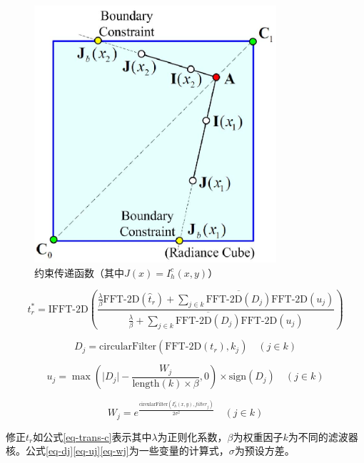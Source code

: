 \begin{figure}[htbp]
    \centering
    \includegraphics[width=0.8\textwidth]{./imgs/g712.png}
    \caption{约束传递函数（其中$J(x) = I_h^c(x,y)$）}
    \label{fig-trans-c}
 \end{figure}

\begin{equation}
    t_r^* = \text{IFFT-2D}\left(\frac{\frac{\lambda}{\beta}\text{FFT-2D}(\hat t_r) + \sum\limits_{j\in k}\overline{\text{FFT-2D}(D_j)}\text{FFT-2D}(u_j)}{\frac{\lambda}{\beta} + \sum\limits_{j\in k}\overline{\text{FFT-2D}(D_j)}\text{FFT-2D}(u_j)}\right)
    \label{eq-trans-c}
\end{equation}

\begin{equation}
    D_j = \text{circularFilter}(\text{FFT-2D}(t_r), k_j)\quad(j\in k)
    \label{eq-dj}
\end{equation}

\begin{equation}
    u_j = \max{(\lvert D_j\rvert - \frac{W_j}{\text{length}(k)\times\beta} ,0)}\times \text{sign}(D_j)\quad(j\in k)
    \label{eq-uj}
\end{equation}

\begin{equation}
    W_j = e^{\frac{\text{circularFilter}(I_h^c(x,y), filter_j)}{2\sigma^2}}\quad(j\in k)
    \label{eq-wj}
\end{equation}

修正$t_r$如公式\eqref{eq-trans-c}表示其中$\lambda$为正则化系数，$\beta$为权重因子$k$为不同的滤波器核。公式\eqref{eq-dj}\eqref{eq-uj}\eqref{eq-wj}为一些变量的计算式，$\sigma$为预设方差。

